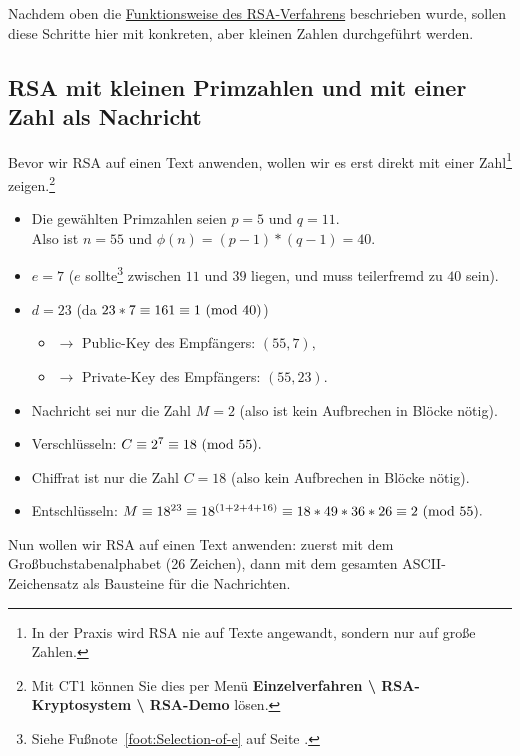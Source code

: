 \begin{refsegment}
Nachdem oben die \hyperlink{RSA}{Funktionsweise des RSA-Verfahrens} beschrieben
wurde, sollen diese Schritte hier mit konkreten, aber kleinen Zahlen
durchgeführt werden.


\subsection{RSA mit kleinen Primzahlen und mit einer Zahl als Nachricht}
Bevor wir RSA auf einen Text anwenden, wollen wir es erst direkt mit einer
Zahl\footnote{%
   In der Praxis wird RSA nie auf Texte angewandt, sondern nur auf große Zahlen.
}
zeigen.\footnote{%
   Mit CT1 können Sie dies per Menü \textbf{Einzelverfahren
   \textbackslash{} RSA-Kryptosystem \textbackslash{} RSA-Demo} lösen.
}
\begin{itemize}
  \item[\textbf{1.}] Die gewählten Primzahlen seien $p=5$ und $q=11$.\\
                Also ist $n=55$ und $\phi(n) = (p-1)*(q-1)=40$.
  \item[\textbf{2.}] $e = 7$ ($e$ sollte\footnote{%
                Siehe Fußnote~\ref{foot:Selection-of-e} auf Seite
                \pageref{foot:Selection-of-e}.} zwischen $11$ und $39$ liegen,
                und muss teilerfremd
                zu $40$ sein).
  \item[\textbf{3.}] $d = 23$ (da $23*7 \equiv 161 \equiv 1{\rm ~(mod~}40)$)
  \begin{itemize}
     \item[] $\rightarrow$ Public-Key des Empfängers: $(55, 7),$
     \item[] $\rightarrow$ Private-Key des Empfängers: $(55, 23).$
  \end{itemize}
  \item[\textbf{4.}] Nachricht sei nur die Zahl $M = 2$ (also ist kein
                Aufbrechen in Blöcke nötig).
  \item[\textbf{5.}] Verschlüsseln: $C \equiv 2^7 \equiv 18 {\rm ~(mod~}55).$
  \item[\textbf{6.}] Chiffrat ist nur die Zahl $C = 18$ (also kein Aufbrechen
                in Blöcke nötig).
  \item[\textbf{7.}] Entschlüsseln: $M \equiv 18^{23} \equiv 18^{(1+2+4+16)} \equiv 18*49*36*26 \equiv 2 {\rm ~(mod~}55).$
\end{itemize}
Nun wollen wir RSA auf einen Text anwenden: zuerst mit dem
Großbuchstabenalphabet (26 Zeichen), dann mit dem gesamten
ASCII-Zeichensatz als Bausteine für die Nachrichten.



\end{refsegment}
